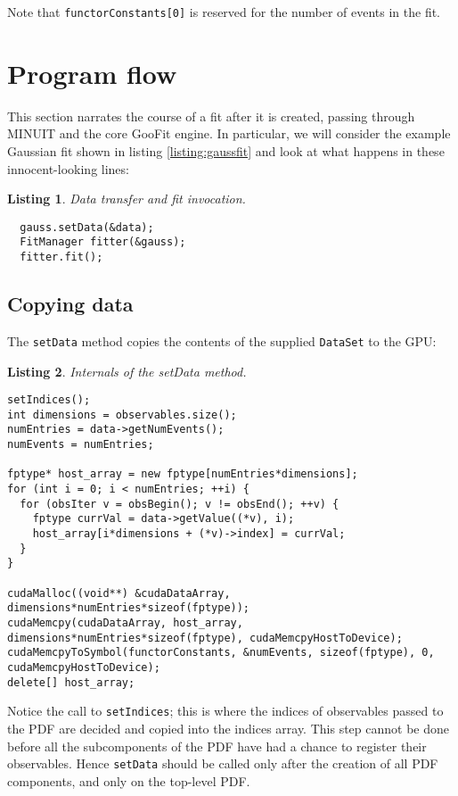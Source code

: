 \documentclass[12pt,pdflatex]{article}
\newtheorem{listing}{Listing}
\begin{document}
Note that \verb|functorConstants[0]| is reserved for the number of events
in the fit. 

\section{Program flow} 
\label{sec:engine}

This section narrates the course of a fit after it is created, passing through
MINUIT and the core GooFit engine. In particular, we will consider the example
Gaussian fit shown in listing \ref{listing:gaussfit} and look at what happens
in these innocent-looking lines:
\begin{listing}
\label{listing:actualfit}
Data transfer and fit invocation.

\begin{verbatim}
  gauss.setData(&data);
  FitManager fitter(&gauss); 
  fitter.fit(); 
\end{verbatim}
\end{listing} 

\subsection{Copying data} 

The \texttt{setData} method copies the contents of the supplied \texttt{DataSet}
to the GPU:
\begin{listing}
\label{listing:setData}
Internals of the setData method.

\begin{verbatim}
setIndices();
int dimensions = observables.size();
numEntries = data->getNumEvents(); 
numEvents = numEntries; 

fptype* host_array = new fptype[numEntries*dimensions];
for (int i = 0; i < numEntries; ++i) {
  for (obsIter v = obsBegin(); v != obsEnd(); ++v) {
    fptype currVal = data->getValue((*v), i);
    host_array[i*dimensions + (*v)->index] = currVal; 
  }
}

cudaMalloc((void**) &cudaDataArray, dimensions*numEntries*sizeof(fptype)); 
cudaMemcpy(cudaDataArray, host_array, dimensions*numEntries*sizeof(fptype), cudaMemcpyHostToDevice);
cudaMemcpyToSymbol(functorConstants, &numEvents, sizeof(fptype), 0, cudaMemcpyHostToDevice); 
delete[] host_array; 
\end{verbatim}
\end{listing} 
Notice the call to \texttt{setIndices}; this is where the indices
of observables passed to the PDF are decided and copied into the indices
array. This step cannot be done before all the subcomponents of the 
PDF have had a chance to register their observables. Hence \texttt{setData}
should be called only after the creation of all PDF components, and only
on the top-level PDF. 
\end{document}
